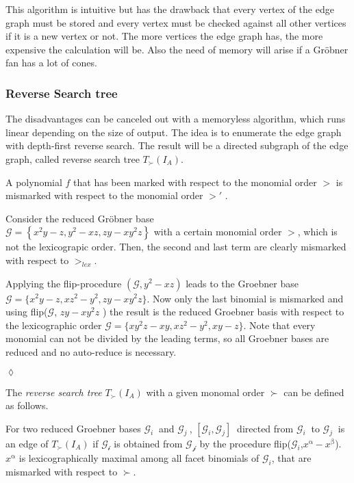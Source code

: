 This algorithm is intuitive but has the drawback that every vertex of the edge graph must be stored and every vertex must be checked against all other vertices if it is a new vertex or not. 
The more vertices the edge graph has, the more expensive the calculation will be. Also the need of memory will arise if a Gröbner fan has a lot of cones.
 
 \newpage

\subsubsection{Reverse Search tree}
The disadvantages can be canceled out with a memoryless algorithm, which runs linear depending on the size of output. The idea is to enumerate the edge graph with depth-first reverse search. The result will be a directed subgraph of the edge graph, called reverse search tree $T_{\succ}(I_{A}) $.\\

\begin{env_definition}
\cite{tigers}
A polynomial $f$ that has been marked with respect to the monomial order $>$  is mismarked with respect to the monomial order $>'$  .
\end{env_definition}

\begin{env_example}\normalfont
Consider the reduced Gröbner base \\ $\mathcal{G} = \left\lbrace x^{2}y-z,y^{2}-xz, zy-xy^{2}z \right\rbrace $ 
with a certain monomial order $>$, which is not the lexicograpic order.
Then, the second and last term are clearly mismarked with respect to $>_{lex}$.

Applying the flip-procedure $(\mathcal{G},y^{2}-xz)$ leads to the Groebner base $\mathcal{G} = \{x^{2}y-z,xz^{2}-y^{2}, zy-xy^{2}z \} $. Now only the last binomial is mismarked and using flip($\mathcal{G}$, $zy-xy^{2}z$ ) the result is the reduced Groebner basis with respect to the lexicographic order $\mathcal{G} = \{xy^{2}z -xy, xz^{2}-y^{2},xy-z \} $. Note that every monomial can not be divided by the leading terms, so all Groebner bases are reduced and no auto-reduce is necessary.
 
\begin{flushright}
$\lozenge$
\end{flushright} 
\end{env_example}


The \textit{reverse search tree} $T_{\succ}(I_{A}) $ with a given monomal order $ \succ $ can be defined as follows.
\begin{env_definition}
\label{def:reverse}
\cite{tigers} For two reduced Groebner bases $ \mathcal{G}_{i}~$ and $ \mathcal{G}_{j}~$, $[\mathcal{G}_{i},\mathcal{G}_{j} ]~$ directed from $\mathcal{G}_{i}~$ to $\mathcal{G}_{j}~$ is an edge of $T_{\succ}(I_{A}) $ if $\mathcal{G_{i}}$ is obtained from $\mathcal{G_{j}}$ by the procedure flip($\mathcal{G}_{i}$,$x^{\upalpha} - x^{\upbeta}$).
$x^{\upalpha}$ is lexicographically maximal among all facet binomials of $\mathcal{G}_{i}$, that are mismarked with respect to $\succ$.
\end{env_definition}


